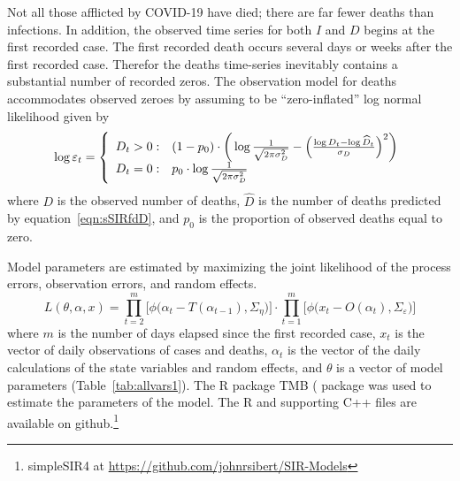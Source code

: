 \documentclass[12pt,letterpaper]{article}
\begin{document}
Not all those afflicted by COVID-19 have died; there are far fewer
deaths than infections. In addition,
the observed time series for both $I$ and $D$ begins at the first recorded
case. The first recorded death occurs several days or weeks after the
first recorded case. 
Therefor the deaths time-series inevitably contains a
substantial number of recorded zeros. 
The observation model for deaths accommodates observed zeroes by
assuming to be ``zero-inflated'' log normal likelihood given by
\begin{equation}
\label{eqn:ZIlogNlike}
  \log \varepsilon_t = \left\{
    \begin{array}{r@{\;:\quad}l}
       D_t > 0 &
(1-p_0)\cdot\bigg(\log\frac{1}{\sqrt{2\pi\sigma^2_D}}
          -\Bigl(\frac{\log D_t-\log\widehat{D}_t}{\sigma_D}\Bigr)^2\bigg)\\
       D_t = 0 & p_0 \cdot\log \frac{1}{\sqrt{2\pi\sigma^2_D}}\\
    \end{array}
  \right.
\end{equation}
where $D$ is the observed number of deaths,
$\widehat{D}$ is the number of deaths predicted by
equation~\ref{eqn:sSIRfdD}, 
and $p_0$ is the proportion of observed deaths equal to zero.


Model parameters are estimated by
maximizing the joint likelihood of the process errors, observation
errors, and random effects.
\begin{equation}
\label{eqn:likelihood}
L(\theta,\alpha,x)=
\prod^m_{t=2}\big[\phi\big(\alpha_t-T(\alpha_{t-1}), \Sigma_\eta\big)\big]\cdot
\prod^m_{t=1}\big[\phi\big(x_t-O(\alpha_t),
\Sigma_\varepsilon\big)\big]
\end{equation}
where $m$ is the number of days elapsed since the first recorded case,
$x_t$ is the vector of daily observations of cases and deaths,
$\alpha_t$ is the vector of the daily calculations of the state
variables and random effects,
and $\theta$ 
is a vector of model parameters (Table~\ref{tab:allvars1}).
The R package TMB (\cite{TMB0000} package was used to 
estimate the parameters of the model. 
The R and supporting C++ files are available on 
github.\footnote{simpleSIR4 at \url{https://github.com/johnrsibert/SIR-Models}}
\end{document}

